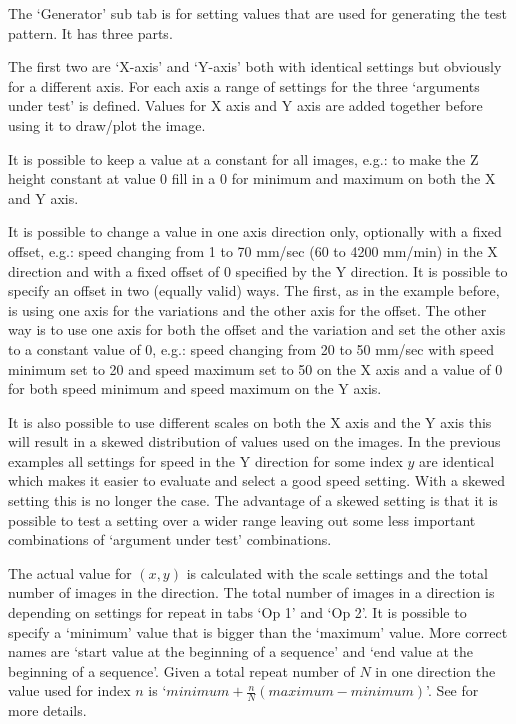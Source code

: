 The `Generator' sub tab is for setting values that are used for generating the test pattern. It has three parts.

The first two are `X-axis' and `Y-axis' both with identical settings but obviously for a different axis. For each axis a range of settings for the three
`arguments under test' is defined. Values for X axis and Y axis are added together before using it to draw/plot the image.

It is possible to keep a value at a constant for all images, e.g.: to make the Z height constant at value 0 fill in a 0 for minimum and maximum on both the X and Y axis.

It is possible to change a value in one axis direction only, optionally with a fixed offset, e.g.: speed changing from 1 to 70 mm/sec (60 to 4200 mm/min) in the X direction
and with a fixed offset of 0 specified by the Y direction. It is possible to specify an offset in two (equally valid) ways. The first, as in the example before, is using one axis
for the variations and the other axis for the offset. The other way is to use one axis for both the offset and the variation and set the other axis to a constant value of 0, e.g.:
speed changing from 20 to 50 mm/sec with speed minimum set to 20 and speed maximum set to 50 on the X axis and a value of 0 for both speed minimum and speed maximum on the Y axis.

It is also possible to use different scales on both the X axis and the Y axis this will result in a skewed distribution of values used on the images. In the previous examples
all settings for speed in the Y direction for some index $y$ are identical which makes it easier to evaluate and select a good speed setting. With a skewed setting this is no
longer the case. The advantage of a skewed setting is that it is possible to test a setting over a wider range leaving out some less important combinations of `argument under test'
combinations.

The actual value for $(x, y)$ is calculated with the scale settings and the total number of images in the direction. The total number of images in a direction is depending on
settings for repeat in tabs `Op 1' and `Op 2'.
It is possible to specify a `minimum' value that is bigger than the `maximum' value. More correct names are `start value at the beginning of a sequence' and
`end value at the beginning of a sequence'. Given a total repeat number of $N$ in one direction the value used for index $n$ is `$minimum + \frac{n}{N}(maximum - minimum)$'.
See  for more details.

